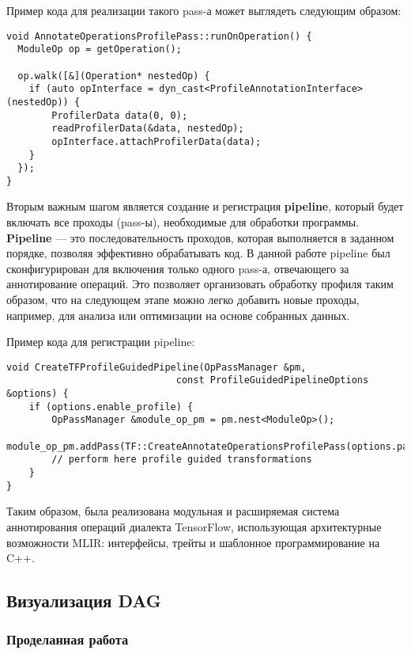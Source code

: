 Пример кода для реализации такого pass-а может выглядеть следующим образом:

\begin{lstlisting}[caption={Проход аннотирования операций}]
void AnnotateOperationsProfilePass::runOnOperation() {
  ModuleOp op = getOperation();

  op.walk([&](Operation* nestedOp) {
    if (auto opInterface = dyn_cast<ProfileAnnotationInterface>(nestedOp)) {
        ProfilerData data(0, 0);
        readProfilerData(&data, nestedOp);
        opInterface.attachProfilerData(data);
    }
  });
}
\end{lstlisting}


Вторым важным шагом является создание и регистрация \textbf{pipeline}, который будет включать все проходы (pass-ы), необходимые для обработки программы.
\textbf{Pipeline} — это последовательность проходов, которая выполняется в заданном порядке, позволяя эффективно обрабатывать код.
В данной работе pipeline был сконфигурирован для включения только одного pass-а, отвечающего за аннотирование операций.
Это позволяет организовать обработку профиля таким образом, что на следующем этапе можно легко добавить новые проходы, например, для анализа или оптимизации на основе собранных данных.

Пример кода для регистрации pipeline:

\newpage

\begin{lstlisting}[caption={Регистрация PGO pipeline-а}]
void CreateTFProfileGuidedPipeline(OpPassManager &pm,
                              const ProfileGuidedPipelineOptions &options) {
    if (options.enable_profile) {
        OpPassManager &module_op_pm = pm.nest<ModuleOp>();
        module_op_pm.addPass(TF::CreateAnnotateOperationsProfilePass(options.path_to_profile));
        // perform here profile guided transformations
    }
}
\end{lstlisting}


Таким образом, была реализована модульная и расширяемая система аннотирования операций диалекта TensorFlow, использующая архитектурные возможности MLIR: интерфейсы, трейты и шаблонное программирование на C++.

\subsection{Визуализация DAG}

\subsubsection{Проделанная работа}

